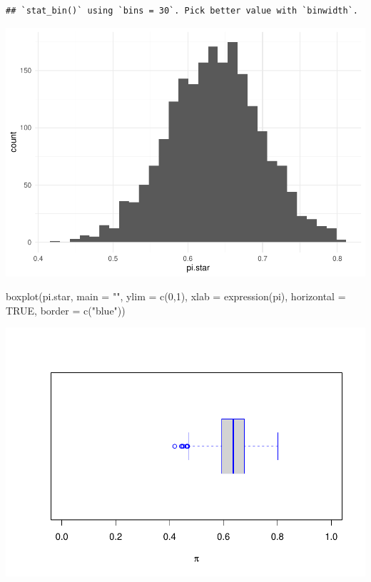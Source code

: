 \documentclass[
]{article}
\newenvironment{Shaded}{\begin{snugshade}}{\end{snugshade}}
\newcommand{\AttributeTok}[1]{\textcolor[rgb]{0.77,0.63,0.00}{#1}}
\newcommand{\ConstantTok}[1]{\textcolor[rgb]{0.00,0.00,0.00}{#1}}
\newcommand{\DecValTok}[1]{\textcolor[rgb]{0.00,0.00,0.81}{#1}}
\newcommand{\FunctionTok}[1]{\textcolor[rgb]{0.00,0.00,0.00}{#1}}
\newcommand{\NormalTok}[1]{#1}
\newcommand{\StringTok}[1]{\textcolor[rgb]{0.31,0.60,0.02}{#1}}
\begin{document}
\begin{verbatim}
## `stat_bin()` using `bins = 30`. Pick better value with `binwidth`.
\end{verbatim}

\includegraphics{bmp_main_files/figure-latex/unnamed-chunk-7-2.pdf}

\begin{Shaded}
\begin{Highlighting}[]
\FunctionTok{boxplot}\NormalTok{(pi.star, }\AttributeTok{main =} \StringTok{""}\NormalTok{, }\AttributeTok{ylim =} \FunctionTok{c}\NormalTok{(}\DecValTok{0}\NormalTok{,}\DecValTok{1}\NormalTok{), }\AttributeTok{xlab =} \FunctionTok{expression}\NormalTok{(pi), }\AttributeTok{horizontal =} \ConstantTok{TRUE}\NormalTok{,}
        \AttributeTok{border =} \FunctionTok{c}\NormalTok{(}\StringTok{"blue"}\NormalTok{))}
\end{Highlighting}
\end{Shaded}

\includegraphics{bmp_main_files/figure-latex/unnamed-chunk-8-1.pdf}
\end{document}
